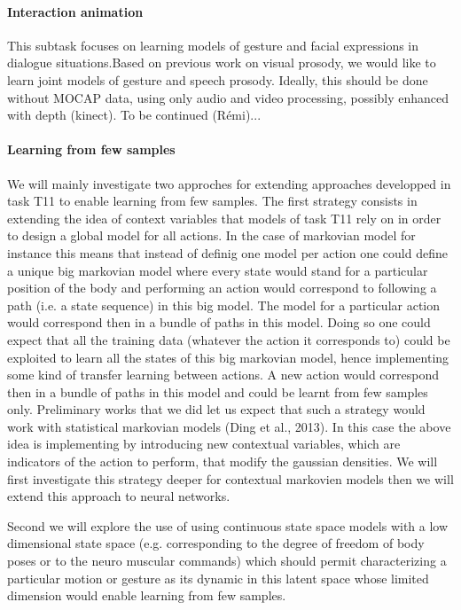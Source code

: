 \paragraph{Interaction animation} 

This subtask focuses on learning models of gesture and facial expressions in dialogue situations.Based on previous work on  visual prosody, we would like to learn joint models of gesture and  speech prosody. Ideally, this should be done without MOCAP data, using only audio and video processing, possibly enhanced with depth (kinect). To be continued (Rémi)...



\paragraph{Learning from few samples} 


% 

We will mainly investigate two approches for extending approaches developped in task T11 to enable learning from few samples. The first strategy consists in extending the idea of context variables that models of task T11 rely on in order to design a global model for all actions.
In the case of markovian model for instance this means that instead of definig one model per action one could define a unique big markovian model where every state would stand for a particular position of the body and performing an action would correspond to following a path (i.e. a state sequence) in this big model. The model for a particular action would correspond then in a bundle of paths in this model.  Doing so one could expect that all the training data (whatever the action it corresponds to) could be exploited to learn all the states of this big markovian model, hence implementing some kind of transfer learning between actions. A new action would correspond then in a bundle of paths in this model and could be learnt from few samples only. Preliminary works that we did let us expect that such a strategy would work with statistical markovian models (Ding et al., 2013). In this case the above idea is implementing by introducing new contextual variables, which are indicators of the action to perform, that modify the gaussian densities. We will first investigate this strategy deeper for contextual markovien models then we will extend this approach to neural networks. 

Second we will explore the use of using continuous state space models with a low dimensional state space (e.g. corresponding to the degree of freedom of body poses or to the neuro muscular commands) which should permit characterizing a particular motion or gesture as its dynamic in this latent space whose limited dimension would enable learning from few samples.  


\endinput